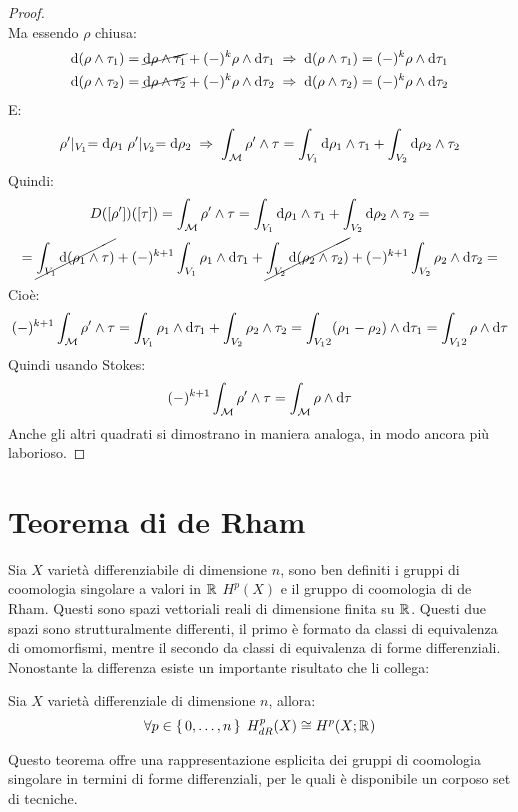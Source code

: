 \begin{proof}
\[  \]
  Ma essendo $ \rho $ chiusa:
  \begin{gather*}
    \d {(\rho \wedge \tau_1)} = \cancel{\d \rho \wedge \tau_1} + (-)^k \rho \wedge \d \tau_1 \; \Rightarrow \; \d {(\rho \wedge \tau_1)} = (-)^k \rho \wedge \d \tau_1 \\
    \d {(\rho \wedge \tau_2)} = \cancel{\d \rho \wedge \tau_2} + (-)^k \rho \wedge \d \tau_2 \; \Rightarrow \; \d {(\rho \wedge \tau_2)} = (-)^k \rho \wedge \d \tau_2
  \end{gather*}
  E:
  \[
    \rho' \lvert_{V_1} = \operatorname{d}\!{\rho}_1 \;   \rho' \lvert_{V_2} = \operatorname{d}\!{\rho}_2 \; \Rightarrow \;  \int_{\mathcal{M}} \rho' \wedge \tau = \int_{V_1} \operatorname{d}\!{\rho}_1 \wedge \tau_1 + \int_{V_2} \operatorname{d}\!{\rho}_2 \wedge \tau_2
  \]
  Quindi:
  \begin{gather*}
    D([\rho'])([\tau]) = \int_{\mathcal{M}} \rho' \wedge \tau = \int_{V_1} \operatorname{d}\!{\rho}_1 \wedge \tau_1 + \int_{V_2} \operatorname{d}\!{\rho}_2 \wedge \tau_2 = \\
    = \cancel{\int_{V_1} \operatorname{d}\!{(\rho_1 \wedge \tau)}} + (-)^{k+1} \int_{V_1} \rho_1 \wedge \operatorname{d}\!{\tau}_1 + \cancel{\int_{V_2} \operatorname{d}\!{(\rho_2 \wedge \tau_2)}} + (-)^{k+1} \int_{V_2} \rho_2 \wedge \operatorname{d}\!{\tau}_2 =
  \end{gather*}
  Cioè:
  \[
    (-)^{k+1} \int_{\mathcal{M}} \rho' \wedge \tau = \int_{V_1} \rho_1 \wedge \operatorname{d}\!{\tau}_1 + \int_{V_2} \rho_2 \wedge \tau_2 = \int_{V_12} (\rho_1 - \rho_2) \wedge \operatorname{d}\!{\tau}_1 = \int_{V_12} \rho \wedge \operatorname{d}\!{\tau}
  \]
  Quindi usando Stokes:
  \[
    (-)^{k+1} \int_{\mathcal{M}} \rho' \wedge \tau = \int_{\mathcal{M}} \rho \wedge \operatorname{d}\!{\tau}
  \]
  Anche gli altri quadrati si dimostrano in maniera analoga, in modo ancora più laborioso.
\end{proof}


\section{Teorema di de Rham}

Sia $ X $ varietà differenziabile di dimensione $ n $, sono ben definiti i
gruppi di coomologia singolare a valori in $ \mathbb{R}^{} $ $ H^p(X) $ e il gruppo di
coomologia di de Rham. Questi sono spazi vettoriali reali di dimensione finita
su $ \mathbb{R}^{} $. Questi due spazi sono strutturalmente differenti, il primo è
formato da classi di equivalenza di omomorfismi, mentre il secondo da classi di
equivalenza di forme differenziali. Nonostante la differenza esiste un importante
risultato che li collega:
\begin{theorem}
  Sia $ X $ varietà differenziale di dimensione $ n $, allora:
  \[
    \forall p \in \set{0, \dots, n} \; H^p_{dR}(X) \cong H^p(X;\mathbb{R}^{})
  \]
\end{theorem}
Questo teorema offre una rappresentazione esplicita dei gruppi di coomologia
singolare in termini di forme differenziali, per le quali è disponibile un corposo
set di tecniche.

